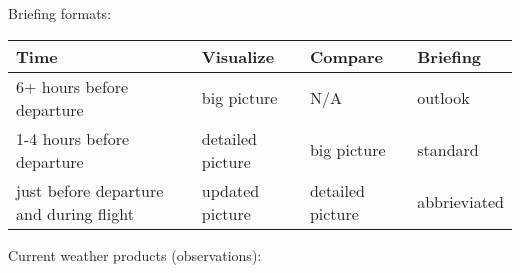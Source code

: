 Briefing formats:

\begin{table}[h]
\centering
\begin{tabular}{llll}
Time                                    & Visualize        & Compare          & Briefing     \\\hline
6+ hours before departure               & big picture      & N/A              & outlook      \\
1-4 hours before departure              & detailed picture & big picture      & standard     \\
just before departure and during flight & updated picture  & detailed picture & abbrieviated
\end{tabular}
\end{table}

Current weather products (observations):

